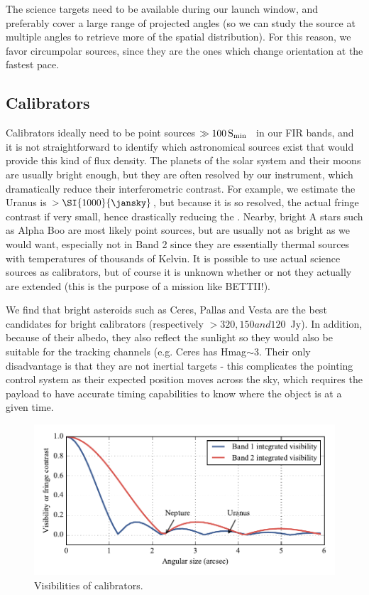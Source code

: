The science targets need to be available during our launch window, and preferably cover a large range of projected angles (so we can study the source at multiple angles to retrieve more of the spatial distribution). For this reason, we favor circumpolar sources, since they are the ones which change orientation at the fastest pace.


\subsection{Calibrators}

Calibrators ideally need to be point sources $\gg\SI{100}S_\textrm{min}$~\si{\jansky} in our FIR bands, and it is not straightforward to identify which astronomical sources exist that would provide this kind of flux density. The planets of the solar system and their moons are usually bright enough, but they are often resolved by our instrument, which dramatically reduce their interferometric contrast. For example, we estimate the Uranus is $>\SI{1000}{\jansky}$, but because it is so resolved, the actual fringe contrast if very small, hence drastically reducing the \SNR. Nearby, bright A stars such as Alpha Boo are most likely point sources, but are usually not as bright as we would want, especially not in Band 2 since they are essentially thermal sources with temperatures of thousands of Kelvin. It is possible to use actual science sources as calibrators, but of course it is unknown whether or not they actually are extended (this is the purpose of a mission like BETTII!). 

We find that bright asteroids such as Ceres, Pallas and Vesta are the best candidates for bright calibrators (respectively $> 320, 150 and 120$~Jy). In addition, because of their albedo, they also reflect the sunlight so they would also be suitable for the tracking channels (e.g. Ceres has Hmag$\sim$3. Their only disadvantage is that they are not inertial targets - this complicates the pointing control system as their expected position moves across the sky, which requires the payload to have accurate timing capabilities to know where the object is at a given time.

\begin{figure}[!h]
	\centering
	\includegraphics[width=\textwidth]{Figures/Visibilities.pdf}
	\caption[Visibilities of calibrators]{Visibilities of calibrators.}
	\label{fig:Visibilities}
    \end{figure}


